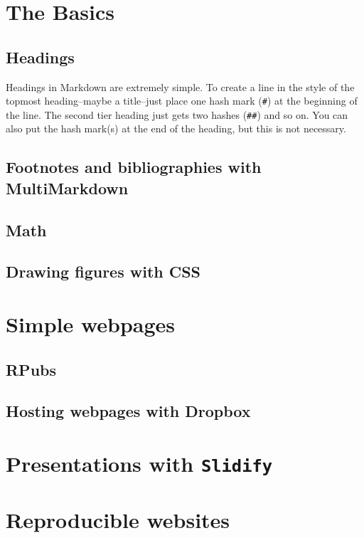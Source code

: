 \documentclass[ChapterTOCs,krantz1]{krantz}\usepackage{graphicx, color}
\begin{document}
\section{The Basics}

\subsection{Headings}

Headings in Markdown are extremely simple. To create a line in the style
of the topmost heading--maybe a title--just place one hash mark
(\texttt{\#}) at the beginning of the line. The second tier heading just
gets two hashes (\texttt{\#\#}) and so on. You can also put the hash
mark(s) at the end of the heading, but this is not necessary.

\subsection{Footnotes and bibliographies with MultiMarkdown}

\subsection{Math}

\subsection{Drawing figures with CSS}

\section{Simple webpages}

\subsection{RPubs}

\subsection{Hosting webpages with Dropbox}

\section{Presentations with \texttt{Slidify}}

\section{Reproducible websites}
\end{document}

